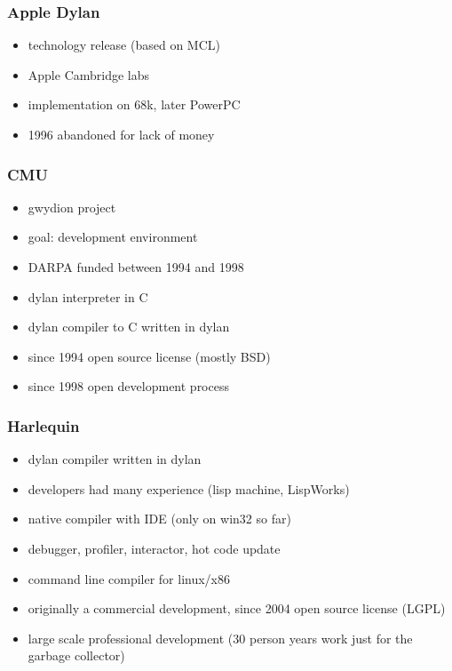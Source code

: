 \documentclass[compress]{beamer}
\begin{document}
\begin{frame}
  \frametitle{Apple Dylan}
  \begin{itemize}
  \item technology release (based on MCL)
  \item Apple Cambridge labs
  \item implementation on 68k, later PowerPC
  \item 1996 abandoned for lack of money
  \end{itemize}
\end{frame}

\begin{frame}
  \frametitle{CMU}
  \begin{itemize}
  \item gwydion project
  \item goal: development environment
  \item DARPA funded between 1994 and 1998
  \item dylan interpreter in C
  \item dylan compiler to C written in dylan
  \item since 1994 open source license (mostly BSD)
  \item since 1998 open development process
  \end{itemize}
\end{frame}

\begin{frame}
  \frametitle{Harlequin}
  \begin{itemize}
  \item dylan compiler written in dylan
  \item developers had many experience (lisp machine, LispWorks)
  \item native compiler with IDE (only on win32 so far)
  \item debugger, profiler, interactor, hot code update
  \item command line compiler for linux/x86
  \item originally a commercial development, since 2004 open source license (LGPL)
  \item large scale professional development (30 person years work just for the garbage collector)
  \end{itemize}
\end{frame}
\end{document}
